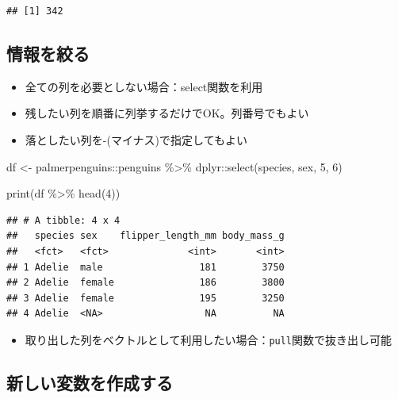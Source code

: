 \documentclass[
]{ltjsarticle}
\newenvironment{Shaded}{\begin{snugshade}}{\end{snugshade}}
\newcommand{\DecValTok}[1]{\textcolor[rgb]{0.00,0.00,0.81}{#1}}
\newcommand{\FunctionTok}[1]{\textcolor[rgb]{0.00,0.00,0.00}{#1}}
\newcommand{\NormalTok}[1]{#1}
\newcommand{\OtherTok}[1]{\textcolor[rgb]{0.56,0.35,0.01}{#1}}
\newcommand{\SpecialCharTok}[1]{\textcolor[rgb]{0.00,0.00,0.00}{#1}}
\providecommand{\tightlist}{%
  \setlength{\itemsep}{0pt}\setlength{\parskip}{0pt}}
\begin{document}
\begin{verbatim}
## [1] 342
\end{verbatim}

\hypertarget{ux60c5ux5831ux3092ux7d5eux308b}{%
\subsection{情報を絞る}\label{ux60c5ux5831ux3092ux7d5eux308b}}

\begin{itemize}
\tightlist
\item
  全ての列を必要としない場合：select関数を利用
\item
  残したい列を順番に列挙するだけでOK。列番号でもよい
\item
  落としたい列を-(マイナス)で指定してもよい
\end{itemize}

\begin{Shaded}
\begin{Highlighting}[]
\NormalTok{df }\OtherTok{\textless{}{-}}\NormalTok{ palmerpenguins}\SpecialCharTok{::}\NormalTok{penguins }\SpecialCharTok{\%\textgreater{}\%}
\NormalTok{  dplyr}\SpecialCharTok{::}\FunctionTok{select}\NormalTok{(species, sex, }\DecValTok{5}\NormalTok{, }\DecValTok{6}\NormalTok{)}

\FunctionTok{print}\NormalTok{(df }\SpecialCharTok{\%\textgreater{}\%} \FunctionTok{head}\NormalTok{(}\DecValTok{4}\NormalTok{))}
\end{Highlighting}
\end{Shaded}

\begin{verbatim}
## # A tibble: 4 x 4
##   species sex    flipper_length_mm body_mass_g
##   <fct>   <fct>              <int>       <int>
## 1 Adelie  male                 181        3750
## 2 Adelie  female               186        3800
## 3 Adelie  female               195        3250
## 4 Adelie  <NA>                  NA          NA
\end{verbatim}

\begin{itemize}
\tightlist
\item
  取り出した列をベクトルとして利用したい場合：\texttt{pull}関数で抜き出し可能
\end{itemize}

\hypertarget{ux65b0ux3057ux3044ux5909ux6570ux3092ux4f5cux6210ux3059ux308b}{%
\subsection{新しい変数を作成する}\label{ux65b0ux3057ux3044ux5909ux6570ux3092ux4f5cux6210ux3059ux308b}}
\end{document}
